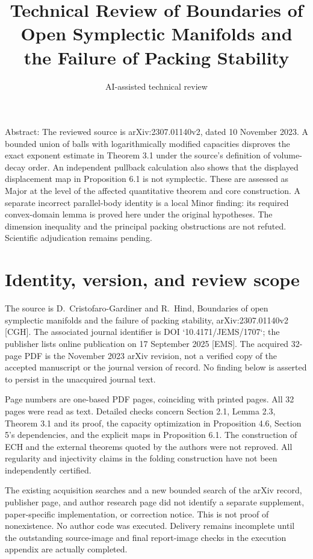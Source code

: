 \documentclass[10pt]{article}
\title{Technical Review of
Boundaries of Open Symplectic Manifolds
and the Failure of Packing Stability}
\author{AI-assisted technical review}
\date{}
\begin{document}
\maketitle
Abstract: The reviewed source is arXiv:2307.01140v2, dated 10 November 2023. A bounded union of balls with logarithmically modified capacities disproves the exact exponent estimate in Theorem 3.1 under the source’s definition of volume-decay order. An independent pullback calculation also shows that the displayed displacement map in Proposition 6.1 is not symplectic. These are assessed as Major at the level of the affected quantitative theorem and core construction. A separate incorrect parallel-body identity is a local Minor finding: its required convex-domain lemma is proved here under the original hypotheses. The dimension inequality and the principal packing obstructions are not refuted. Scientific adjudication remains pending.\par
\section*{Identity, version, and review scope}
The source is D. Cristofaro-Gardiner and R. Hind, Boundaries of open symplectic manifolds and the failure of packing stability, arXiv:2307.01140v2 [CGH]. The associated journal identifier is DOI `10.4171/JEMS/1707`; the publisher lists online publication on 17 September 2025 [EMS]. The acquired 32-page PDF is the November 2023 arXiv revision, not a verified copy of the accepted manuscript or the journal version of record. No finding below is asserted to persist in the unacquired journal text.\par
Page numbers are one-based PDF pages, coinciding with printed pages. All 32 pages were read as text. Detailed checks concern Section 2.1, Lemma 2.3, Theorem 3.1 and its proof, the capacity optimization in Proposition 4.6, Section 5’s dependencies, and the explicit maps in Proposition 6.1. The construction of ECH and the external theorems quoted by the authors were not reproved. All regularity and injectivity claims in the folding construction have not been independently certified.\par
The existing acquisition searches and a new bounded search of the arXiv record, publisher page, and author research page did not identify a separate supplement, paper-specific implementation, or correction notice. This is not proof of nonexistence. No author code was executed. Delivery remains incomplete until the outstanding source-image and final report-image checks in the execution appendix are actually completed.\par
\end{document}
